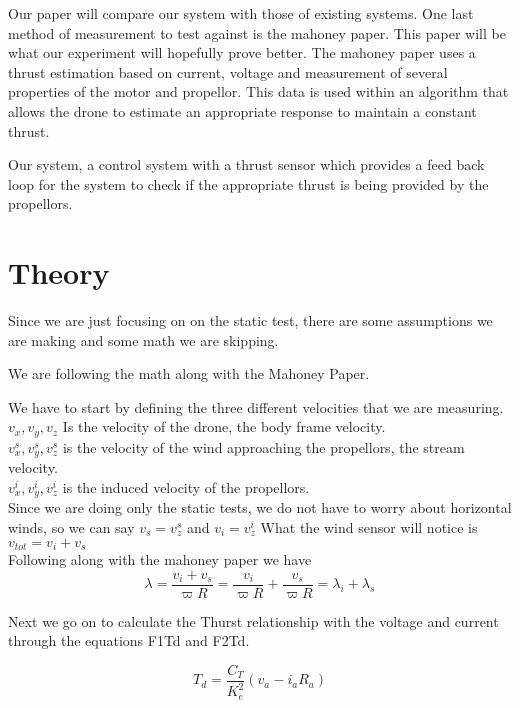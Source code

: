\documentclass{article}
\begin{document}
Our paper will compare our system with those of existing systems. One last method of measurement to test against is the mahoney paper. This paper will be what our experiment will hopefully prove better. The mahoney paper uses a thrust estimation based on current, voltage and measurement of several properties of the motor and propellor. This data is used within an algorithm that allows the drone to estimate an appropriate response to maintain a constant thrust. 

Our system, a control system with a thrust sensor which provides a feed back loop for the system to check if the appropriate thrust is being provided by the propellors. 

\section{Theory}

Since we are just focusing on on the static test, there are some assumptions we are making and some math we are skipping. 

We are following the math along with the Mahoney Paper.

We have to start by defining the three different velocities that we are measuring.\\

$v_{x} , v_{y} , v_{z}$  Is the velocity of the drone, the body frame velocity. \\
$v^s_{x} , v^s_{y} , v^s_{z}$ is the velocity of the wind approaching the propellors, the stream velocity. \\
$v^i_{x} , v^i_{y} , v^i_{z}$ is the induced velocity of the propellors.\\

Since we are doing only the static tests, we do not have to worry about horizontal winds, so we can say $v_s = v^s_{z}$ and $v_i = v^i_{z}$
What the wind sensor will notice is $v_{tot} = v_{i} + v_{s}$\\

Following along with the mahoney paper we have
\begin{equation}
\lambda = \frac{v_{i} + v_{s}}{\varpi R}
= \frac{v_{i}}{\varpi R}+\frac{v_{s}}{\varpi R}
=\lambda_{i} + \lambda_{s}
\end{equation}

Next we go on to calculate the Thurst relationship with the voltage and current through the equations F1Td and F2Td.

\begin{equation}
T_{d} = \frac{C_{T}}{K^2_{e}}(v_{a} - i_{a}R_{a})
\end{equation}
\end{document}
